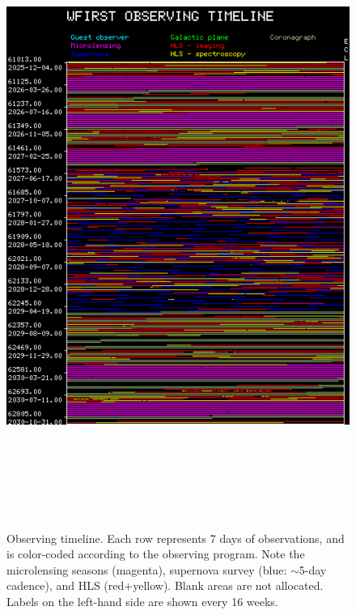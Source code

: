 \begin{figure}
\includegraphics[height=8in]{Plots/observing_chart.pdf}
\caption{\label{fig:observing_chart}Observing timeline. Each row represents 7 days of observations, and is color-coded according to the observing program. Note the microlensing seasons (magenta), supernova survey (blue: $\sim$5-day cadence), and HLS (red+yellow). Blank areas are not allocated. Labels on the left-hand side are shown every 16 weeks.}
\end{figure}

